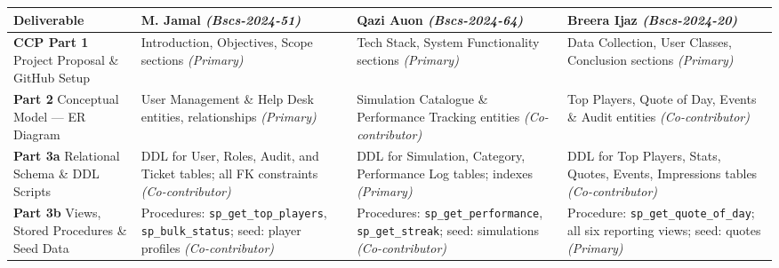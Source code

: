 \documentclass[12pt,a4paper]{article}
\begin{document}
\begin{longtable}{p{3.8cm} p{3.5cm} p{3.5cm} p{3.5cm}}
    \toprule
    \textbf{Deliverable} &
    \textbf{M. Jamal} \newline \textit{(Bscs-2024-51)} &
    \textbf{Qazi Auon} \newline \textit{(Bscs-2024-64)} &
    \textbf{Breera Ijaz} \newline \textit{(Bscs-2024-20)} \\
    \midrule
    \endhead

    \textbf{CCP Part 1} \newline
    Project Proposal \&
    GitHub Setup &
    Introduction, Objectives,
    Scope sections \newline
    \textit{(Primary)} &
    Tech Stack, System
    Functionality sections \newline
    \textit{(Primary)} &
    Data Collection, User
    Classes, Conclusion sections \newline
    \textit{(Primary)} \\[8pt]

    \textbf{Part 2} \newline
    Conceptual Model ---
    ER Diagram&
    User Management \&
    Help Desk entities,
    relationships \newline
    \textit{(Primary)} &
    Simulation Catalogue \&
    Performance Tracking
    entities \newline
    \textit{(Co-contributor)} &
    Top Players, Quote of Day,
    Events \& Audit entities \newline
    \textit{(Co-contributor)} \\[8pt]

    \textbf{Part 3a} \newline
    Relational Schema \&
    DDL Scripts&
    DDL for User, Roles,
    Audit, and Ticket tables;
    all FK constraints \newline
    \textit{(Co-contributor)} &
    DDL for Simulation,
    Category, Performance
    Log tables; indexes \newline
    \textit{(Primary)} &
    DDL for Top Players,
    Stats, Quotes, Events,
    Impressions tables \newline
    \textit{(Co-contributor)} \\[8pt]

    \textbf{Part 3b} \newline
    Views, Stored Procedures
    \& Seed Data&
    Procedures:
    \texttt{sp\_get\_top\_players},
    \texttt{sp\_bulk\_status};
    seed: player profiles \newline
    \textit{(Co-contributor)} &
    Procedures:
    \texttt{sp\_get\_performance},
    \texttt{sp\_get\_streak};
    seed: simulations \newline
    \textit{(Co-contributor)} &
    Procedure:
    \texttt{sp\_get\_quote\_of\_day};
    all six reporting views;
    seed: quotes \newline
    \textit{(Primary)} \\[8pt]


\end{longtable}
\end{document}
